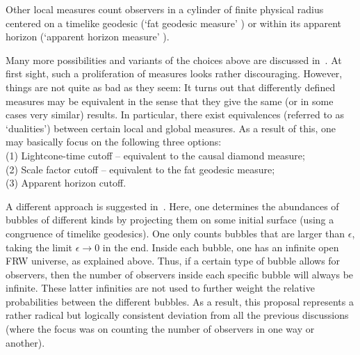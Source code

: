\documentclass[12pt]{article}
\numberwithin{equation}{section}
\begin{document}
Other local measures count observers in a cylinder of finite physical radius centered on a timelike geodesic (`fat geodesic measure' \cite{Bousso:2008hz}) or within its apparent horizon (`apparent horizon measure' \cite{Bousso:2010im}).

Many more possibilities and variants of the choices above are discussed in~\cite{Freivogel:2011eg}. At first sight, such a proliferation of measures looks rather discouraging. However, things are not quite as bad as they seem: It turns out that differently defined measures may be equivalent in the sense that they give the same (or in some cases very similar) results. In particular, there exist equivalences (referred to as `dualities') between certain local and global measures. As a result of this, one may basically focus on the following three options: \\[.2cm]
(1) Lightcone-time cutoff -- equivalent to the causal diamond measure;\\ 
(2) Scale factor cutoff -- equivalent to the fat geodesic measure;\\
(3) Apparent horizon cutoff.

A different approach is suggested in~\cite{Garriga:2005av}. Here, one determines the abundances of bubbles of different kinds by projecting them on some initial surface (using a congruence of timelike geodesics). One only counts bubbles that are larger than $\epsilon$, taking the limit $\epsilon\to 0$ in the end. Inside each bubble, one has an infinite open FRW universe, as explained above. Thus, if a certain type of bubble allows for observers, then the number of observers inside each specific bubble will always be infinite. These latter infinities are not used to further weight the relative probabilities between the different bubbles. As a result, this proposal represents a rather radical but logically consistent deviation from all the previous discussions (where the focus was on counting the number of observers in one way or another).
\end{document}
